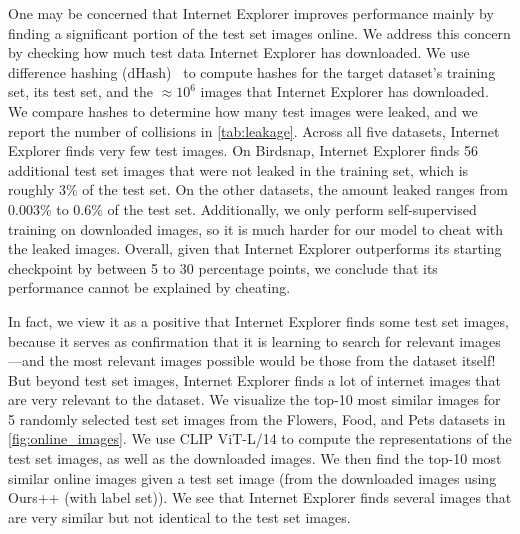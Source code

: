 One may be concerned that Internet Explorer improves performance mainly by finding a significant portion of the test set images online. We address this concern by checking how much test data Internet Explorer has downloaded. We use difference hashing (dHash)~\cite{imagehash} to compute hashes for the target dataset's training set, its test set, and the $\approx 10^6$ images that Internet Explorer has downloaded. We compare hashes to determine how many test images were leaked, and we report the number of collisions in \cref{tab:leakage}. Across all five datasets, Internet Explorer finds very few test images. On Birdsnap, Internet Explorer finds 56 additional test set images that were not leaked in the training set, which is roughly $3\%$ of the test set. On the other datasets, the amount leaked ranges from $0.003\%$ to $0.6\%$ of the test set. Additionally, we only perform self-supervised training on downloaded images, so it is much harder for our model to cheat with the leaked images. Overall, given that Internet Explorer outperforms its starting checkpoint by between 5 to 30 percentage points, we conclude that its performance cannot be explained by cheating.

In fact, we view it as a positive that Internet Explorer finds some test set images, because it serves as confirmation that it is learning to search for relevant images---and the most relevant images possible would be those from the dataset itself!
But beyond test set images, Internet Explorer finds a lot of internet images that are very relevant to the dataset. We visualize the top-10 most similar images for 5 randomly selected test set images from the Flowers, Food, and Pets datasets in \cref{fig:online_images}.  We use CLIP ViT-L/14 to compute the representations of the test set images, as well as the downloaded images. We then find the top-10 most similar online images given a test set image (from the downloaded images using Ours++ (with label set)).
We see that Internet Explorer finds several images that are very similar but not identical to the test set images.



